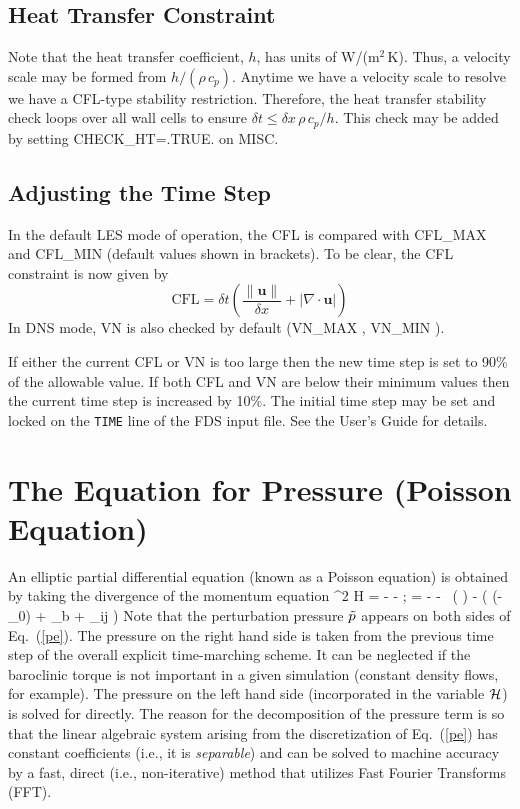 \subsection{Heat Transfer Constraint}

Note that the heat transfer coefficient, $h$, has units of W/(m$^2$\,K).  Thus, a velocity scale may be formed from $h/(\rho\, c_p)$.  Anytime we have a velocity scale to resolve we have a CFL-type stability restriction.  Therefore, the heat transfer stability check loops over all wall cells to ensure $\delta t \le \delta x \,\rho \,c_p/h$.  This check may be added by setting {\ct CHECK\_HT=.TRUE.} on {\ct MISC}.

\subsection{Adjusting the Time Step}

In the default LES mode of operation, the CFL is compared with {\ct CFL\_MAX \![1.0]} and {\ct CFL\_MIN \![0.8]} (default values shown in brackets).  To be clear, the CFL constraint is now given by
\begin{equation}
\mbox{CFL} = \delta t \left( \frac{\|\mathbf{u}\|}{\delta x} + |\nabla\cdot\mathbf{u}| \right)
\end{equation}
In DNS mode, VN is also checked by default ({\ct VN\_MAX \![0.5]}, {\ct VN\_MIN \![0.4]}).

If either the current CFL or VN is too large then the new time step is set to 90\% of the allowable value.  If both CFL and VN are below their minimum values then the current time step is increased by 10\%.  The initial time step may be set and locked on the {\tt TIME} line of the FDS input file.  See the User's Guide for details.


\section{The Equation for Pressure (Poisson Equation)}

An elliptic partial differential equation (known as a Poisson equation) is obtained by
taking the divergence of the momentum equation
\be \nabla^2 {\cal H} =
     - - \nabla\!\cdot \bF
    \quad ; \quad \bF = - \bu\times\bo - \tp \, \nabla \! \left(  \right) - 
    \Big( (\rho-\rho_0) \bg + \bof_b + \nabla\!\cdot \btau_{ij} \Big)
   \label{pe}\ee
Note that the perturbation pressure $\tilde{p}$ appears on both sides of Eq.~(\ref{pe}). The
pressure on the right hand side is taken from the previous time step of the
overall explicit time-marching scheme. It can be neglected if the baroclinic torque is
not important in a given simulation (constant density flows, for example). The pressure on the left hand side (incorporated
in the variable $\cal H$) is solved for directly.
The reason for the decomposition of the pressure term is so that the linear algebraic system
arising from the discretization of Eq.~(\ref{pe})
has constant coefficients (i.e., it is {\em separable}) and can be solved to machine accuracy
by a fast, direct (i.e., non-iterative) method that utilizes
Fast Fourier Transforms (FFT).

